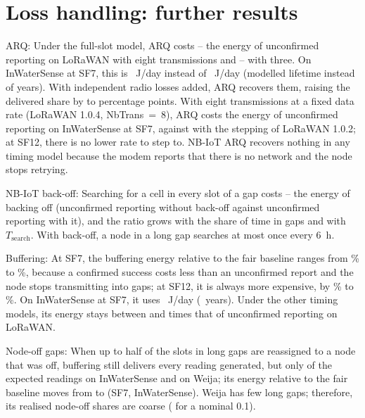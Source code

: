 \documentclass[journal]{IEEEtran}
\begin{document}
\section{Loss handling: further results}
\label{sec:s-handling}
ARQ: Under the full-slot model, ARQ costs \arqEightMin--\arqEightMax{} the energy of unconfirmed reporting on LoRaWAN with eight transmissions and \arqThreeMin--\arqThreeMax{} with three. On InWaterSense at SF7, this is \inwSevenArqE~J/day instead of \inwSevenUnconfE~J/day (modelled lifetime \inwSevenArqLife{} instead of \inwSevenUnconfLife{} years). With independent radio losses added, ARQ recovers them, raising the delivered share by \arqGainMin{} to \arqGainMax{} percentage points. With eight transmissions at a fixed data rate (LoRaWAN 1.0.4, NbTrans~=~8), ARQ costs \arqVOneZeroFour{} the energy of unconfirmed reporting on InWaterSense at SF7, against \arqVOneZeroTwo{} with the stepping of LoRaWAN 1.0.2; at SF12, there is no lower rate to step to. NB-IoT ARQ recovers nothing in any timing model because the modem reports that there is no network and the node stops retrying.

NB-IoT back-off: Searching for a cell in every slot of a gap costs \backoffMin--\backoffMax{} the energy of backing off (unconfirmed reporting without back-off against unconfirmed reporting with it), and the ratio grows with the share of time in gaps and with $T_\mathrm{search}$. With back-off, a node in a long gap searches at most once every 6~h.

Buffering: At SF7, the buffering energy relative to the fair baseline ranges from \bufSevenMin\% to \bufSevenMax\%, because a confirmed success costs less than an unconfirmed report and the node stops transmitting into gaps; at SF12, it is always more expensive, by \bufTwelveMin\% to \bufTwelveMax\%. On InWaterSense at SF7, it uses \inwSevenBufE~J/day (\inwSevenBufLife~years). Under the other timing models, its energy stays between \arqBufRatioMin{} and \arqBufRatioMax{} times that of unconfirmed reporting on LoRaWAN.

Node-off gaps: When up to half of the slots in long gaps are reassigned to a node that was off, buffering still delivers every reading generated, but only \offExpectedInws{} of the expected readings on InWaterSense and \offExpectedWeija{} on Weija; its energy relative to the fair baseline moves from \offBufFairZero{} to \offBufFairHalf{} (SF7, InWaterSense). Weija has few long gaps; therefore, its realised node-off shares are coarse (\offRealisedWeija{} for a nominal 0.1).
\end{document}
